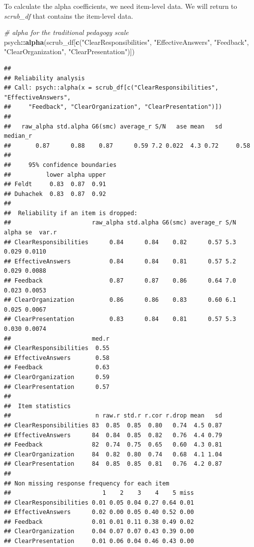 \documentclass[
  11pt,
]{book}
\newenvironment{Shaded}{\begin{snugshade}}{\end{snugshade}}
\newcommand{\CommentTok}[1]{\textcolor[rgb]{0.37,0.37,0.37}{\textit{#1}}}
\newcommand{\FunctionTok}[1]{\textcolor[rgb]{0.27,0.27,0.27}{\textbf{#1}}}
\newcommand{\NormalTok}[1]{#1}
\newcommand{\SpecialCharTok}[1]{\textcolor[rgb]{0.43,0.43,0.43}{\textbf{#1}}}
\newcommand{\StringTok}[1]{\textcolor[rgb]{0.5,0.5,0.5}{#1}}
\begin{document}
To calculate the alpha coefficients, we need item-level data. We will return to \emph{scrub\_df} that contains the item-level data.

\begin{Shaded}
\begin{Highlighting}[]
\CommentTok{\# alpha for the traditional pedagogy scale}
\NormalTok{psych}\SpecialCharTok{::}\FunctionTok{alpha}\NormalTok{(scrub\_df[}\FunctionTok{c}\NormalTok{(}\StringTok{"ClearResponsibilities"}\NormalTok{, }\StringTok{"EffectiveAnswers"}\NormalTok{, }\StringTok{"Feedback"}\NormalTok{,}
    \StringTok{"ClearOrganization"}\NormalTok{, }\StringTok{"ClearPresentation"}\NormalTok{)])}
\end{Highlighting}
\end{Shaded}

\begin{verbatim}
## 
## Reliability analysis   
## Call: psych::alpha(x = scrub_df[c("ClearResponsibilities", "EffectiveAnswers", 
##     "Feedback", "ClearOrganization", "ClearPresentation")])
## 
##   raw_alpha std.alpha G6(smc) average_r S/N   ase mean   sd median_r
##       0.87      0.88    0.87      0.59 7.2 0.022  4.3 0.72     0.58
## 
##     95% confidence boundaries 
##          lower alpha upper
## Feldt     0.83  0.87  0.91
## Duhachek  0.83  0.87  0.92
## 
##  Reliability if an item is dropped:
##                       raw_alpha std.alpha G6(smc) average_r S/N alpha se  var.r
## ClearResponsibilities      0.84      0.84    0.82      0.57 5.3    0.029 0.0110
## EffectiveAnswers           0.84      0.84    0.81      0.57 5.2    0.029 0.0088
## Feedback                   0.87      0.87    0.86      0.64 7.0    0.023 0.0053
## ClearOrganization          0.86      0.86    0.83      0.60 6.1    0.025 0.0067
## ClearPresentation          0.83      0.84    0.81      0.57 5.3    0.030 0.0074
##                       med.r
## ClearResponsibilities  0.55
## EffectiveAnswers       0.58
## Feedback               0.63
## ClearOrganization      0.59
## ClearPresentation      0.57
## 
##  Item statistics 
##                        n raw.r std.r r.cor r.drop mean   sd
## ClearResponsibilities 83  0.85  0.85  0.80   0.74  4.5 0.87
## EffectiveAnswers      84  0.84  0.85  0.82   0.76  4.4 0.79
## Feedback              82  0.74  0.75  0.65   0.60  4.3 0.81
## ClearOrganization     84  0.82  0.80  0.74   0.68  4.1 1.04
## ClearPresentation     84  0.85  0.85  0.81   0.76  4.2 0.87
## 
## Non missing response frequency for each item
##                          1    2    3    4    5 miss
## ClearResponsibilities 0.01 0.05 0.04 0.27 0.64 0.01
## EffectiveAnswers      0.02 0.00 0.05 0.40 0.52 0.00
## Feedback              0.01 0.01 0.11 0.38 0.49 0.02
## ClearOrganization     0.04 0.07 0.07 0.43 0.39 0.00
## ClearPresentation     0.01 0.06 0.04 0.46 0.43 0.00
\end{verbatim}
\end{document}
